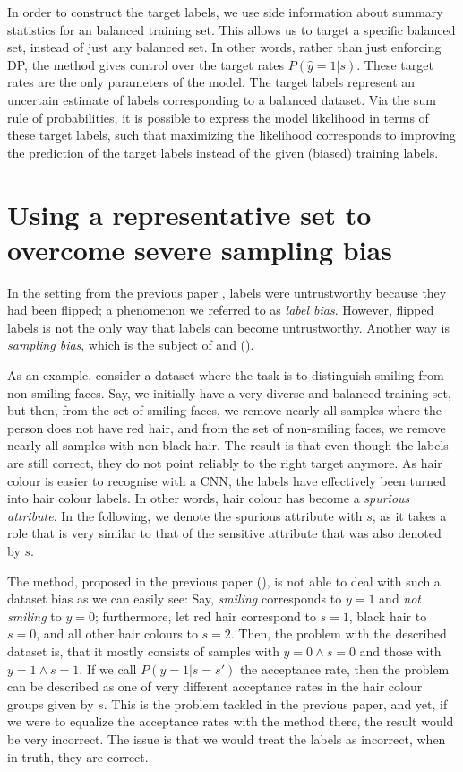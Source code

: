 In order to construct the target labels,
we use side information about summary statistics for an balanced training set.
This allows us to target a specific balanced set, instead of just any balanced set.
In other words, rather than just enforcing \ac{DP}, the method gives control over the target rates \(P(\hat{y}=1|s)\).
These target rates are the only parameters of the model.
The target labels represent an uncertain estimate of labels corresponding to a balanced dataset.
Via the sum rule of probabilities, it is possible to express the model likelihood in terms of these target labels,
such that maximizing the likelihood corresponds to improving the prediction of the target labels
instead of the given (biased) training labels.

\section{Using a representative set to overcome severe sampling bias}\label{sec:nifr}
In the setting from the previous paper \citep{kehrenberg2020tuning},
labels were untrustworthy because they had been flipped;
a phenomenon we referred to as \emph{label bias}.
However, flipped labels is not the only way that labels can become untrustworthy.
Another way is \emph{sampling bias}, which is the subject of \citet{kehrenberg2020nullsampling} and \citet{kehrenberg2020zeroshot} ().

As an example, consider a dataset where the task is to distinguish smiling from non-smiling faces.
Say, we initially have a very diverse and balanced training set,
but then, from the set of smiling faces, we remove nearly all samples where the person does not have red hair,
and from the set of non-smiling faces, we remove nearly all samples with non-black hair.
The result is that even though the labels are still correct, they do not point reliably to the right target anymore.
As hair colour is easier to recognise with a \ac{CNN}, the labels have effectively been turned into hair colour labels.
In other words, hair colour has become a \emph{spurious attribute}.
In the following, we denote the spurious attribute with \(s\),
as it takes a role that is very similar to that of the sensitive attribute that was also denoted by \(s\).

The method, proposed in the previous paper (),
is not able to deal with such a dataset bias as we can easily see:
Say, \emph{smiling} corresponds to \(y=1\) and \emph{not smiling} to \(y=0\);
furthermore, let red hair correspond to \(s=1\), black hair to \(s=0\), and all other hair colours to \(s=2\).
Then, the problem with the described dataset is, that it mostly consists of samples with \(y=0\wedge s=0\)
and those with \(y=1\wedge s=1\).
If we call \(P(y=1|s=s')\) the acceptance rate,
then the problem can be described as one of very different acceptance rates in the hair colour groups given by \(s\).
This is the problem tackled in the previous paper,
and yet, if we were to equalize the acceptance rates with the method there,
the result would be very incorrect.
The issue is that we would treat the labels as incorrect, when in truth, they are correct.

